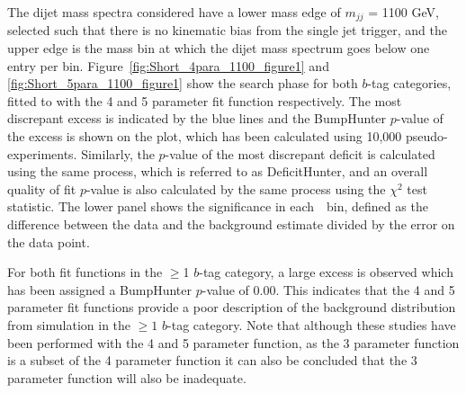The dijet mass spectra considered have a lower mass edge of $m_{jj}$ = 1100 GeV,
selected such that there is no kinematic bias from the single jet trigger,
and the upper edge is the mass bin at which the dijet mass spectrum goes below one entry per bin.
Figure~\ref{fig:Short_4para_1100_figure1} and \ref{fig:Short_5para_1100_figure1} show the search phase
for both $b$-tag categories, fitted to with the 4 and 5 parameter fit function respectively.
The most discrepant excess is indicated by the blue lines and the BumpHunter $p$-value of the excess is shown on the plot,
which has been calculated using 10,000 pseudo-experiments.
Similarly, the $p$-value of the most discrepant deficit is calculated using the same process, which is referred to as DeficitHunter,
and an overall quality of fit $p$-value is also calculated by the same process using the $\chi^{2}$ test statistic.
The lower panel shows the significance in each~\mjj~bin,
defined as the difference between the data and the background estimate divided by the error on the data point.

For both fit functions in the $\geq$1 $b$-tag category,
a large excess is observed which has been assigned a BumpHunter $p$-value of 0.00.
This indicates that the 4 and 5 parameter fit functions
provide a poor description of the background distribution from simulation
in the $\geq1$ $b$-tag category.
Note that although these studies have been performed with the 4 and 5 parameter function,
as the 3 parameter function is a subset of the 4 parameter function it can also be concluded
that the 3 parameter function will also be inadequate.

